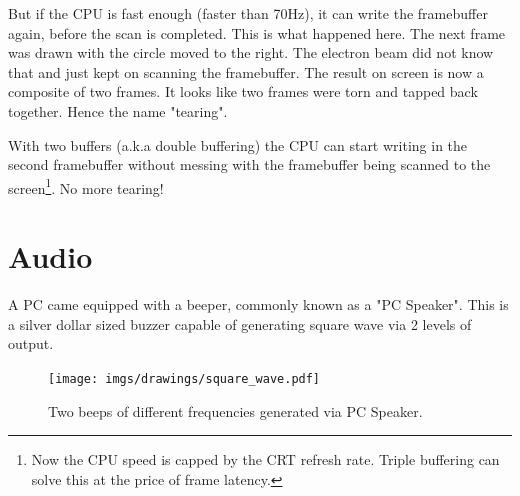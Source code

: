 \documentclass[book.tex]{subfiles}
\begin{document}
\par
But if the CPU is fast enough (faster than 70Hz), it can write the framebuffer again, before the scan is completed. This is what happened here. The next frame was drawn with the circle moved to the right. The electron beam did not know that and just kept on scanning the framebuffer. The result on screen is now a composite of two frames. It looks like two frames were torn and tapped back together. Hence the name "tearing".\\
\par
With two buffers (a.k.a double buffering) the CPU can start writing in the second framebuffer without messing with the framebuffer being scanned to the screen\footnote{Now the CPU speed is capped by the CRT refresh rate. Triple buffering can solve this at the price of frame latency.}. No more tearing!
















\section{Audio}
A PC came equipped with a beeper, commonly known as a "PC Speaker". This is a silver dollar sized buzzer capable of generating square wave via 2 levels of output.\\
\par
 \begin{figure}[H]
\centering
\texttt{[image: imgs/drawings/square\_wave.pdf]}
\caption{Two beeps of different frequencies generated via PC Speaker.}
\end{figure}
\end{document}
